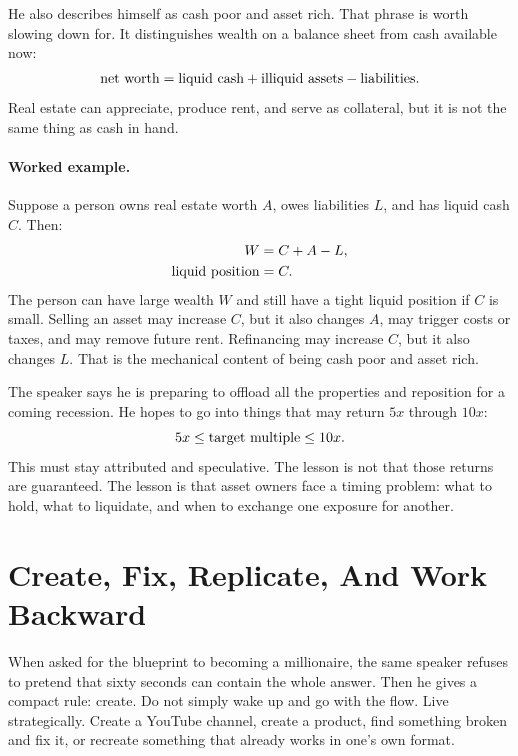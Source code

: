 He also describes himself as cash poor and asset rich. That phrase is worth slowing down for. It distinguishes wealth on a balance sheet from cash available now:
\begin{equation}
\hbox{net worth}
=
\hbox{liquid cash}
+
\hbox{illiquid assets}
-
\hbox{liabilities}.
\end{equation}
Real estate can appreciate, produce rent, and serve as collateral, but it is not the same thing as cash in hand.

\paragraph{Worked example.}
Suppose a person owns real estate worth \(A\), owes liabilities \(L\), and has liquid cash \(C\). Then:
\begin{align}
W &= C + A - L,\\
\hbox{liquid position} &= C.
\end{align}
The person can have large wealth \(W\) and still have a tight liquid position if \(C\) is small. Selling an asset may increase \(C\), but it also changes \(A\), may trigger costs or taxes, and may remove future rent. Refinancing may increase \(C\), but it also changes \(L\). That is the mechanical content of being cash poor and asset rich.

The speaker says he is preparing to offload all the properties and reposition for a coming recession. He hopes to go into things that may return \(5x\) through \(10x\):
\begin{equation}
5x \leq \hbox{target multiple} \leq 10x.
\end{equation}
This must stay attributed and speculative. The lesson is not that those returns are guaranteed. The lesson is that asset owners face a timing problem: what to hold, what to liquidate, and when to exchange one exposure for another.

\section{Create, Fix, Replicate, And Work Backward}

When asked for the blueprint to becoming a millionaire, the same speaker refuses to pretend that sixty seconds can contain the whole answer. Then he gives a compact rule: create. Do not simply wake up and go with the flow. Live strategically. Create a YouTube channel, create a product, find something broken and fix it, or recreate something that already works in one's own format.

